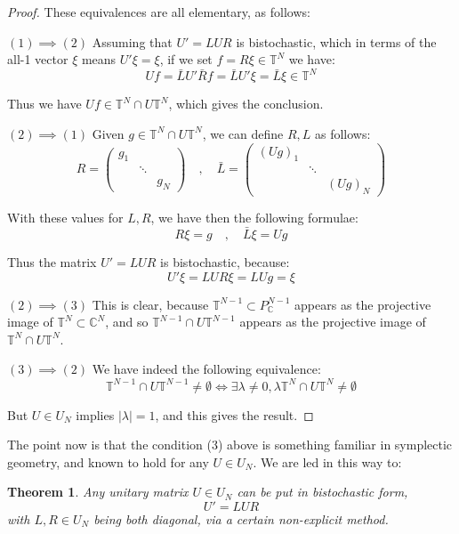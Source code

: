 \documentclass[12pt]{amsbook}
\newtheorem{theorem}{Theorem}[chapter]
\begin{document}
\begin{proof}
These equivalences are all elementary, as follows:

\medskip

$(1)\implies(2)$ Assuming that $U'=LUR$ is bistochastic, which in terms of the all-1 vector $\xi$ means $U'\xi=\xi$, if we set $f=R\xi\in\mathbb T^N$ we have:
$$Uf
=\bar{L}U'\bar{R}f
=\bar{L}U'\xi
=\bar{L}\xi\in\mathbb T^N$$

Thus we have $Uf\in\mathbb T^N\cap U\mathbb T^N$, which gives the conclusion.

\medskip

$(2)\implies(1)$ Given $g\in\mathbb T^N\cap U\mathbb T^N$, we can define $R,L$ as follows:
$$R=\begin{pmatrix}g_1\\&\ddots\\&&g_N\end{pmatrix}\quad,\quad 
\bar{L}=\begin{pmatrix}(Ug)_1\\&\ddots\\&&(Ug)_N\end{pmatrix}$$

With these values for $L,R$, we have then the following formulae:
$$R\xi=g\quad,\quad 
\bar{L}\xi=Ug$$

Thus the matrix $U'=LUR$ is bistochastic, because:
$$U'\xi
=LUR\xi
=LUg
=\xi$$

$(2)\implies(3)$ This is clear, because $\mathbb T^{N-1}\subset P^{N-1}_\mathbb C$ appears as the projective image of $\mathbb T^N\subset\mathbb C^N$, and so $\mathbb T^{N-1}\cap U\mathbb T^{N-1}$ appears as the projective image of $\mathbb T^N\cap U\mathbb T^N$.

\medskip

$(3)\implies(2)$ We have indeed the following equivalence:
$$\mathbb T^{N-1}\cap U\mathbb T^{N-1}\neq\emptyset
\iff\exists\lambda\neq 0,\lambda\mathbb T^N\cap U\mathbb T^N\neq\emptyset$$

But $U\in U_N$ implies $|\lambda|=1$, and this gives the result.
\end{proof}

The point now is that the condition (3) above is something familiar in symplectic geometry, and known to hold for any $U\in U_N$. We are led in this way to:


\begin{theorem}
Any unitary matrix $U\in U_N$ can be put in bistochastic form,
$$U'=LUR$$
with $L,R\in U_N$ being both diagonal, via a certain non-explicit method.
\end{theorem}
\end{document}
